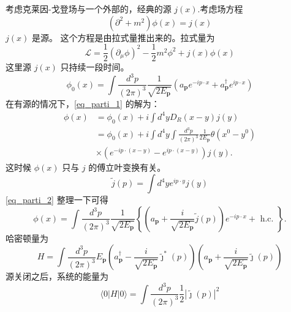 
考虑克莱因-戈登场与一个外部的，经典的源 $j(x)$.考虑场方程
\begin{equation}\label{eq_parti_1}
(\partial^2+m^2)\phi(x) = j(x)
\end{equation}
$j(x)$ 是源。 这个方程是由拉式量推出来的。拉式量为
\begin{equation}
\mathcal L = \frac{1}{2} (\partial_\mu\phi)^2 - \frac{1}{2} m^2 \phi^2 + j(x) \phi(x)
\end{equation}
这里源 $j(x)$ 只持续一段时间。
\begin{equation}
\phi_{0}(x)=\int \frac{d^{3} p}{(2 \pi)^{3}} \frac{1}{\sqrt{2 E_{\mathbf{p}}}}\left(a_{\mathbf{p}} e^{-i p \cdot x}+a_{\mathbf{p}}^{\dagger} e^{i p \cdot x}\right)
\end{equation}
在有源的情况下，\autoref{eq_parti_1} 的解为：
\begin{equation}\label{eq_parti_2}
\begin{aligned}
\phi(x) & =\phi_{0}(x)+i \int d^{4} y D_{R}(x-y) j(y) \\
& =\phi_{0}(x)+i \int d^{4} y \int \frac{d^{3} p}{(2 \pi)^{3}} \frac{1}{2 E_{\mathbf{p}}} \theta\left(x^{0}-y^{0}\right) \\
& \times\left(e^{-i p \cdot(x-y)}-e^{i p \cdot(x-y)}\right) j(y) .
\end{aligned}
\end{equation}
这时候 $\phi(x)$ 只与 $j$ 的傅立叶变换有关。
\begin{equation}
\tilde j (p) = \int d^4 y e^{ip \cdot y} j(y)
\end{equation}
\autoref{eq_parti_2} 整理一下可得
\begin{equation}
\phi(x)=\int \frac{d^{3} p}{(2 \pi)^{3}} \frac{1}{\sqrt{2 E_{\mathbf{p}}}}\left\{\left(a_{\mathbf{p}}+\frac{i}{\sqrt{2 E_{\mathbf{p}}}} \tilde{j}(p)\right) e^{-i p \cdot x}+\text { h.c. }\right\} .
\end{equation}
哈密顿量为
\begin{equation}
H=\int \frac{d^{3} p}{(2 \pi)^{3}} E_{\mathbf{p}}\left(a_{\mathbf{p}}^{\dagger}-\frac{i}{\sqrt{2 E_{\mathbf{p}}}} \tilde{\jmath}^{*}(p)\right)\left(a_{\mathbf{p}}+\frac{i}{\sqrt{2 E_{\mathbf{p}}}} \tilde{\jmath}(p)\right)
\end{equation}
源关闭之后，系统的能量为
\begin{equation}
\langle 0|H| 0\rangle=\int \frac{d^{3} p}{(2 \pi)^{3}} \frac{1}{2}|\tilde{\jmath}(p)|^{2}
\end{equation}


